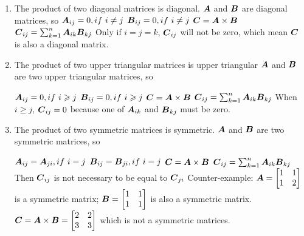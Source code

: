 \documentclass{article}
\begin{document}
\begin{enumerate}%

\item The product of two diagonal matrices is diagonal. \newline
$\boldsymbol{A} $  and  $\boldsymbol{B} $ are diagonal matrices, so \newline 
$\boldsymbol{A}_{ij}= 0, if \ i\neq j $  \newline
$\boldsymbol{B}_{ij}= 0, if \ i\neq j $  \newline
$\boldsymbol{C} = \boldsymbol{A}\times\boldsymbol{B}$ \newline
$\boldsymbol{C}_{ij}=\sum_{k=1}^{n}{\boldsymbol{A}_{ik}\boldsymbol{B}_{kj}} $\newline
Only if $i=j=k$, $\boldsymbol{C}_{ij} $ will not be zero, which mean $\boldsymbol{C}$ is also a diagonal matrix. 

\item The product of two upper triangular matrices is upper triangular
$\boldsymbol{A} $  and  $\boldsymbol{B} $ are two upper triangular matrices, so \newline 

$\boldsymbol{A}_{ij}= 0, if  \ i \geqslant j $  \newline
$\boldsymbol{B}_{ij}= 0, if \ i\geqslant j $  \newline
$\boldsymbol{C} = \boldsymbol{A}\times\boldsymbol{B}$ \newline
$\boldsymbol{C}_{ij}=\sum_{k=1}^{n}{\boldsymbol{A}_{ik}\boldsymbol{B}_{kj}} $\newline
When $i\geqslant j $, $\boldsymbol{C}_{ij}=0 $ because one of $\boldsymbol{A}_{ik} $ and $\boldsymbol{B}_{kj} $ must be zero. 



\item The product of two symmetric matrices is symmetric.
$\boldsymbol{A} $  and  $\boldsymbol{B} $ are two symmetric matrices, so \newline 

$\boldsymbol{A}_{ij}= \boldsymbol{A}_{ji} , if \  i = j $  \newline
$\boldsymbol{B}_{ij}= \boldsymbol{B}_{ji} , if\  i = j $  \newline
$\boldsymbol{C} = \boldsymbol{A}\times\boldsymbol{B}$ \newline
$\boldsymbol{C}_{ij}=\sum_{k=1}^{n}{\boldsymbol{A}_{ik}\boldsymbol{B}_{kj}} $\newline
Then $\boldsymbol{C}_{ij} $ is not necessary to be equal to $\boldsymbol{C}_{ji} $\newline
Counter-example: \newline
$\boldsymbol{A}=\begin{bmatrix} 1&1\\1&2 \end{bmatrix}$ is a symmetric matrix; \newline
$\boldsymbol{B}=\begin{bmatrix} 1&1\\1&1 \end{bmatrix}$ is also a symmetric matrix.\newline
$\boldsymbol{C} = \boldsymbol{A}\times\boldsymbol{B} = \begin{bmatrix} 2&2\\3&3 \end{bmatrix} $ which is not a symmetric matrices.  \newline



\end{enumerate}
\end{document}
